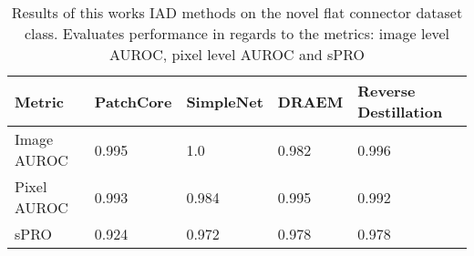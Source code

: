\begin{table}[htbp]
    \tiny
    \centering
    \begin{tabularx}{\textwidth}{|X|X|X|X|X|}%
        \hline
        \textbf{Metric} & \textbf{PatchCore} \cite{patchCore2022} & \textbf{SimpleNet} \cite{liu2023simplenet} & \textbf{DRAEM} \cite{Zavrtanik_2021DRAEM} & \textbf{Reverse Destillation} \cite{revdist2023} \\
        \hline
        Image AUROC & 0.995 & 1.0 & 0.982 & 0.996 \\
        \hline
        Pixel AUROC & 0.993 & 0.984 & 0.995 & 0.992 \\
        \hline
        sPRO & 0.924 & 0.972 & 0.978 & 0.978 \\
        \hline
    \end{tabularx}
    \caption{Results of this works IAD methods on the novel flat connector dataset class. Evaluates performance in regards to the metrics: image level AUROC, pixel level AUROC and sPRO}
    \label{tab:flatconnectorperformance}
\end{table}
